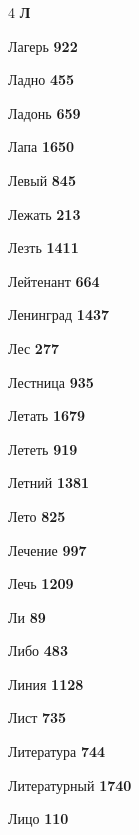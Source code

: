 \begin{multicols}{4}
\vspace{0.6em}\noindent\textbf{\normalsize\sffamily\color{primary} Л}\par\vspace{0.2em}
\noindent Лагерь \dotfill \textbf{\color{secondary} 922}\par
\noindent Ладно \dotfill \textbf{\color{secondary} 455}\par
\noindent Ладонь \dotfill \textbf{\color{secondary} 659}\par
\noindent Лапа \dotfill \textbf{\color{secondary} 1650}\par
\noindent Левый \dotfill \textbf{\color{secondary} 845}\par
\noindent Лежать \dotfill \textbf{\color{secondary} 213}\par
\noindent Лезть \dotfill \textbf{\color{secondary} 1411}\par
\noindent Лейтенант \dotfill \textbf{\color{secondary} 664}\par
\noindent Ленинград \dotfill \textbf{\color{secondary} 1437}\par
\noindent Лес \dotfill \textbf{\color{secondary} 277}\par
\noindent Лестница \dotfill \textbf{\color{secondary} 935}\par
\noindent Летать \dotfill \textbf{\color{secondary} 1679}\par
\noindent Лететь \dotfill \textbf{\color{secondary} 919}\par
\noindent Летний \dotfill \textbf{\color{secondary} 1381}\par
\noindent Лето \dotfill \textbf{\color{secondary} 825}\par
\noindent Лечение \dotfill \textbf{\color{secondary} 997}\par
\noindent Лечь \dotfill \textbf{\color{secondary} 1209}\par
\noindent Ли \dotfill \textbf{\color{secondary} 89}\par
\noindent Либо \dotfill \textbf{\color{secondary} 483}\par
\noindent Линия \dotfill \textbf{\color{secondary} 1128}\par
\noindent Лист \dotfill \textbf{\color{secondary} 735}\par
\noindent Литература \dotfill \textbf{\color{secondary} 744}\par
\noindent Литературный \dotfill \textbf{\color{secondary} 1740}\par
\noindent Лицо \dotfill \textbf{\color{secondary} 110}\par

\end{multicols}
